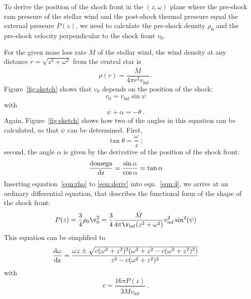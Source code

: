 To derive the position of the shock front in the $(z, \omega)$ plane where the pre-shock ram pressure of the stellar wind and the post-shock thermal pressure equal the external pressure $P(z)$, we need to calculate the pre-shock density $\rho_0$ and the pre-shock velocity perpendicular to the shock front $v_0$.

For the given mass loss rate $\dot M$ of the stellar wind, the wind density at any distance $r=\sqrt{z^2+\omega^2}$ from the central star is 
\begin{equation}\label{eqn:rho}
\rho(r) = \frac{\dot M}{4 \pi r^2 v_{\inf}}\ .
\end{equation}
Figure~\ref{fig:sketch} shows that $v_0$ depends on the position of the shock:
\begin{equation}\label{eqn:v0}
v_0 = v_{\inf} \sin \psi
\end{equation}
with 
\begin{equation}\label{eqn:angle}
\psi+\alpha = - \theta \ .
\end{equation}
Again, Figure~\ref{fig:sketch} shows how two of the angles in this equation can be calculated, so that $\psi$ can be determined. First,
\begin{equation}
\tan\theta = \frac{\omega}{z}\ ;
\end{equation}
second, the angle $\alpha$ is given by the derivative of the position of the shock front:
\begin{equation}\label{eqn:deriv}
\frac{\rm{d}omega}{\rm{d}z} = \frac{\sin \alpha}{\cos \alpha} = \tan{\alpha}
\end{equation}
Inserting equation~\ref{eqn:rho} to \ref{eqn:deriv} into eqn.~\ref{eqn:4}, we arrive at an ordinary differential equation, that describes the functional form of the shape of the shock front:
\begin{equation}
P(z) = \frac{3}{4}\rho_0\v_0^2 = \frac{3}{4} \frac{\dot{M}}{4\pi\v_{\inf}(z^2+\omega^2)} v_{\inf}^2 \sin^2(\psi)
\end{equation}
This equation can be simplified to
\begin{equation}\label{eqn:ode}
\frac{\rm{d}\omega}{\rm{d}z} = \frac{\omega z \pm \sqrt{c (\omega^2+z^2)^2 (\omega^2+z^2-c(\omega^2+z^2)^2)}}{z^2 - c(\omega^2+z^2)^2}
\end{equation}
with
\begin{equation}
c = \frac{16\pi P(z)}{3 \dot{M} v_{\inf}}\ .
\end{equation}